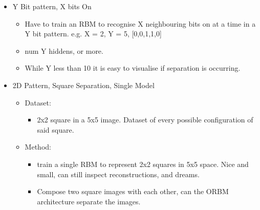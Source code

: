 \begin{itemize}
  \item Y Bit pattern, X bits On
  \begin{itemize}
    \item Have to train an RBM to recognise X neighbouring bits on at a time in a Y bit pattern. e.g. X = 2, Y = 5, [0,0,1,1,0]
    \item num Y hiddens, or more.
    \item While Y less than 10 it is easy to visualise if separation is occurring.
  \end{itemize}

  \item 2D Pattern, Square Separation, Single Model
  \begin{itemize}
    \item Dataset:
    \begin{itemize}
      \item 2x2 square in a 5x5 image. Dataset of every possible configuration of said square.
    \end{itemize}
    \item Method:
    \begin{itemize}
      \item train a single RBM to represent 2x2 squares in 5x5 space. Nice and small, can still inspect reconstructions, and dreams.
      \item Compose two square images with each other, can the ORBM architecture separate the images.
    \end{itemize}
  \end{itemize}


\end{itemize}
